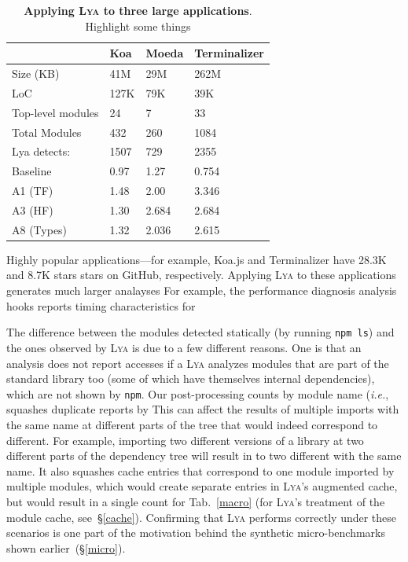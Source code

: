 \documentclass[letterpaper,twocolumn,10pt]{article}
\def\ie{{\em i.e.}, }
\newcommand{\ttt}[1]{\texttt{#1}}
\newcommand{\sx}[1]{(\S\ref{#1})}
\newcommand{\sys}{{\scshape Lya}\xspace}
\newcommand{\fixme}[1]{{\color{red}#1}}
\begin{document}
\begin{table}[t]
\center
\footnotesize
\setlength\tabcolsep{3pt}
\caption{
  \footnotesize{
    \textbf{Applying \sys to three large applications}.
		\fixme{Highlight some things}
  }
}
\begin{tabular*}{\columnwidth}{l @{\extracolsep{\fill}} lll}
\toprule
                    & Koa    & Moeda   &  Terminalizer \\
\midrule
 Size (KB)          & 41M    &  29M    &   262M        \\
 LoC                & 127K   &  79K    &   39K         \\
 Top-level modules  &  24    &  7      &    33         \\
 Total Modules      &  432   &  260    &    1084       \\
 Lya detects:       &  1507  &   729   &     2355      \\
 Baseline           &  0.97  &  1.27   &    0.754      \\
 A1 (TF)            &  1.48  &  2.00   &    3.346      \\
 A3 (HF)            &  1.30  &  2.684  &    2.684      \\
 A8 (Types)         &  1.32  &  2.036  &    2.615      \\     
\bottomrule
\end{tabular*}
\label{tab:macro}
\vspace{-5mm}
\end{table}



Highly popular applications---for example, Koa.js and Terminalizer have 28.3K and 8.7K stars stars on GitHub, respectively.
Applying \sys to these applications generates much larger analayses
For example, the performance diagnosis analysis hooks reports timing characteristics for 

The difference between the modules detected statically (by running \ttt{npm ls}) and the ones observed by \sys is due to a few different reasons.
One is that an analysis does not report accesses if a 
\sys analyzes modules that are part of the standard library too (some of which have themselves internal dependencies), which are not shown by \ttt{npm}.
Our post-processing counts by module name (\ie squashes duplicate reports by 
This can affect the results of multiple imports with the same name at different parts of the tree that would indeed correspond to different.
For example, importing two different versions of a library at two different parts of the dependency tree will result in to two different with the same name.
It also squashes cache entries that correspond to one module imported by multiple modules, which would create separate entries in \sys's augmented cache, but would result in a single count for Tab.~\ref{macro} (for \sys's treatment of the module cache, see~\S\ref{cache}).
Confirming that \sys performs correctly under these scenarios is one part of the motivation behind the synthetic micro-benchmarks shown earlier~\sx{micro}.
\end{document}
